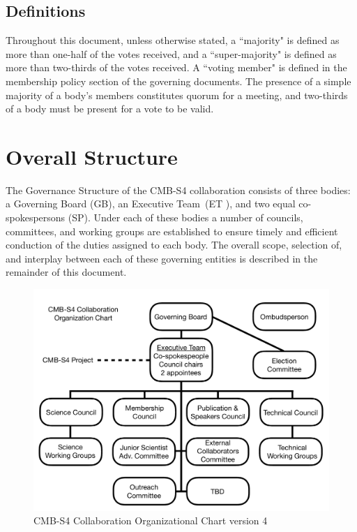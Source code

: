 \documentclass[12pt]{article}
\newcommand{\exec}{{Executive Team}}
\newcommand{\shorte}{{ET }}  %
\begin{document}
\subsection{Definitions}

Throughout this document, unless otherwise stated, a ``majority" is defined as more than one-half of the votes received, and a ``super-majority" is defined as more than two-thirds of the votes received. A ``voting member" is defined in the membership policy section of the governing documents. The presence of a simple majority of a body's members constitutes quorum for a meeting, and two-thirds of a body must be present for a vote to be valid.



\section{Overall Structure}
The Governance Structure of the CMB-S4 collaboration consists of three bodies: a Governing Board (GB), an \exec \ (\shorte), and two equal co-spokespersons (SP). 
Under each of these bodies a number of councils, committees, and working groups are established to ensure timely and efficient conduction of the duties assigned to each body. The overall scope, selection of, and interplay between each of these governing entities is described in the remainder of this document. 


\begin{figure}[h!]
\begin{center}
\includegraphics[width=6.5in]{CMB-S4_Org_chart_+_details_v6.pdf}
\end{center}
\caption{CMB-S4 Collaboration Organizational Chart version 4}
\label{fig:org_chart}
\end{figure}
\end{document}
